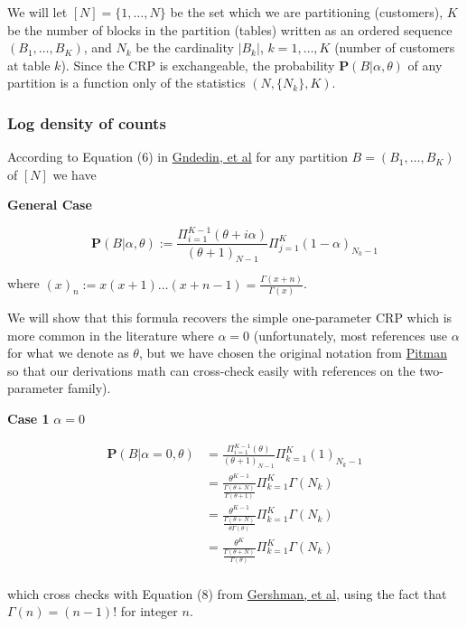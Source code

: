 \documentclass[12pt]{article}
\begin{document}
We will let $[N] = \{1,\dots,N\}$ be the set which we are partitioning (customers),
$K$ be the number of blocks in the partition (tables) written as an ordered sequence
$(B_1,\dots,B_K)$, and $N_k$ be the cardinality $|B_k|$, $k = 1,\dots,K$
(number of customers at table $k$). Since the CRP is exchangeable, the probability
$\mathbf{P}(B|\alpha,\theta)$ of any partition is a function only of the statistics
$(N,\{N_k\},K)$.

\subsubsection{Log density of counts}

According to Equation (6) in
\href{http://arxiv.org/pdf/0909.3642.pdf}{Gndedin, et al}
for any partition $B=(B_1,\dots,B_K)$ of $[N]$ we have

\textbf{General Case}

\begin{equation}
\mathbf{P}(B|\alpha,\theta)
:= \frac{\Pi_{i=1}^{K-1}(\theta+i\alpha)}{(\theta+1)_{N-1}}\Pi_{j=1}^K(1-\alpha)_{N_k-1}
\label{eq:crp-density}
\end{equation}

where $(x)_n := x(x+1)\dots(x+n-1) = \frac{\Gamma(x+n)}{\Gamma(x)}$.

We will show that this formula recovers the simple one-parameter CRP which is more
common in the literature where $\alpha = 0$ (unfortunately, most references use
$\alpha$ for what we denote as $\theta$, but we have chosen the original notation from
\href{http://link.springer.com/article/10.1007/BF01213386}{Pitman} so that our
derivations math can cross-check easily with references on the two-parameter family).

\textbf{Case 1} $\alpha = 0$

\begin{align*}
\mathbf{P}(B|\alpha=0,\theta)
    & = \frac{\Pi_{i=1}^{K-1}(\theta)}{(\theta+1)_{N-1}}\Pi_{k=1}^K(1)_{N_k-1}\\
   & = \frac{\theta^{K-1}}{\frac{\Gamma(\theta+N)}{\Gamma(\theta+1)}}\Pi_{k=1}^K\Gamma(N_k)\\
   & = \frac{\theta^{K-1}}{\frac{\Gamma(\theta+N)}{\theta\Gamma(\theta)}}\Pi_{k=1}^K\Gamma(N_k)\\
   & = \frac{\theta^{K}}{\frac{\Gamma(\theta+N)}{\Gamma(\theta)}}\Pi_{k=1}^K\Gamma(N_k)\\
\end{align*}

which cross checks with Equation (8) from
\href{http://web.mit.edu/sjgershm/www/GershmanBlei12.pdf#page=4}{Gershman, et al},
using the fact that $\Gamma(n) = (n-1)!$ for integer $n$.
\end{document}
